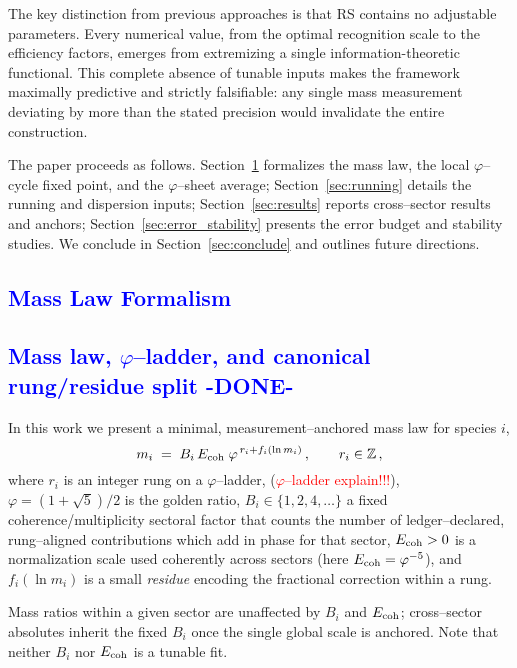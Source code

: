 \documentclass[%
 amsmath,amssymb,
 aps,
prb,
floatfix, showkeys
]{revtex4-2}
\newcommand{\need}[1]{\textcolor{red}{#1}}
\newcommand{\modif}[1]{\textcolor{blue}{#1}}
\begin{document}
The key distinction from previous approaches is that RS contains no adjustable
parameters. Every numerical value, from the optimal recognition scale
to the efficiency factors, emerges from extremizing a single information-theoretic
functional. This complete absence of tunable inputs makes the framework maximally
predictive and strictly falsifiable: any single mass measurement deviating by more
than the stated precision would invalidate the entire construction.


The paper proceeds as follows. Section~\ref{sec:formalism} formalizes the mass law, the local $\varphi$–cycle fixed point, and the $\varphi$–sheet average; Section~\ref{sec:running} details the running and dispersion inputs; Section~\ref{sec:results} reports cross–sector results and anchors; Section~\ref{sec:error_stability} presents the error budget and stability studies. We conclude in Section~\ref{sec:conclude} and outlines future directions.



{\modif{
\section{Mass Law Formalism}
\label{sec:formalism}
}}
\vspace{-1.0cm}
{\modif{
\subsection{Mass law, $\varphi$--ladder, and canonical rung/residue split  -DONE-}
\label{subsec:mass-law}
}}

In this work we present a minimal, measurement–anchored mass law for 
 species $i$, 
\begin{equation}
  m_i \;=\; B_i\,E_{\rm coh}\;\varphi^{\,r_i+f_i(\ln m_i)}\,,\qquad r_i\in\mathbb{Z}\,,
  \label{eq:mass_law_intro}
\end{equation}
where $r_i$ is an integer rung on a $\varphi$–ladder, ({\need{$\varphi$--ladder explain!!!}}),
$\varphi = (1+\sqrt{5})/2$ is the golden ratio, 
$B_i\in\{1,2,4,\dots\}$ a fixed coherence/multiplicity sectoral factor
that counts the number of ledger–declared, rung–aligned contributions which add in
phase for that sector,
 $E_{\rm coh}>0$ is a normalization scale used coherently across sectors (here $E_{\rm coh}=\varphi^{-5}$),
and
 $f_i(\ln m_i)$ is a small  \emph{residue} encoding the fractional correction within a rung.


Mass ratios within a given sector are unaffected by $B_i$ and $E_{\rm coh}$; cross–sector absolutes
inherit the fixed $B_i$ once the single global scale is anchored.
Note that neither $B_i$ nor $E_{\rm coh}$ is a tunable fit.
\end{document}
